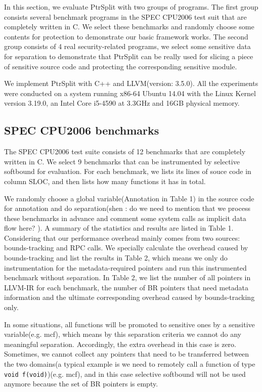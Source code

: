 In this section, we evaluate PtrSplit with two groups of programs. The first group consists several benchmark programs in the SPEC CPU2006 test suit that are completely written in C. We select these benchmarks and randomly choose some contents for protection to demonstrate our basic framework works. The second group consists of 4 real security-related programs, we select some sensitive data for separation to demonstrate that PtrSplit can be really used for slicing a piece of sensitive source code and protecting the corresponding sensitive module.

We implement PtrSplit with C++ and LLVM(version: 3.5.0). All the experiments were conducted on a system running x86-64 Ubuntu 14.04 with the Linux Kernel version 3.19.0, an Intel Core i5-4590 at 3.3GHz and 16GB physical memory.

\subsection {SPEC CPU2006 benchmarks}

The SPEC CPU2006 test suite consists of 12 benchmarks that are completely written in C. We select 9 benchmarks that can be instrumented by selective softbound for evaluation. For each benchmark, we lists its lines of souce code in column SLOC, and then lists how many functions it has in total. 



We randomly choose a global variable(Annotation in Table 1) in the source code for annotation and do separation(shen \todo: do we need to mention that we process these benchmarks in advance and comment some system calls as implicit data flow here? ). A summary of the statistics and results are listed in Table 1. Considering that our performance overhead mainly comes from two sources: bounds-tracking and RPC calls. We specially calculate the overhead caused by bounds-tracking and list the results in Table 2, which means we only do instrumentation for the metadata-required pointers and run this instrumented benchmark without separation. In Table 2, we list the number of all pointers in LLVM-IR for each benchmark, the number of BR pointers that need metadata information and the ultimate corresponding overhead caused by bounds-tracking only.

In some situations, all functions will be promoted to sensitive ones by a sensitive variable(e.g. mcf), which means by this separation criteria we cannot do any meaningful separation. Accordingly, the extra overhead in this case is zero. Sometimes, we cannot collect any pointers that need to be transferred between the two domains(a typical example is we need to remotely call a function of type \texttt{void f(void)})(e.g. mcf), and in this case selective softbound will not be used anymore because the set of BR pointers is empty.

